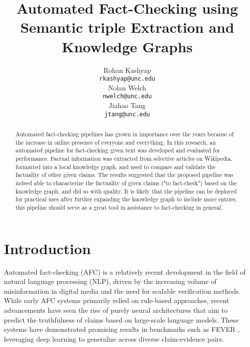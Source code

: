 \documentclass[11pt]{article}
\title{Automated Fact-Checking using Semantic triple Extraction and Knowledge Graphs}
\author{
  Rohan Kashyap \\
  \texttt{rkashyap@unc.edu} \\\And
  Nolan Welch \\
  \texttt{nwelch@unc.edu} \\\And
  Jiahao Tang \\
  \texttt{jtang@unc.edu}
}
\begin{document}
\maketitle
\begin{abstract}
Automated fact-checking pipelines has grown in importance over the years because of the increase in online presence of everyone and everything. In this research, an automated pipeline for fact-checking given text was developed and evaluated for performance. Factual information was extracted from selective articles on Wikipedia, formatted into a local knowledge graph, and used to compare and validate the factuality of other given claims. The results suggested that the proposed pipeline was indeed able to characterize the factuality of given claims ("to fact-check") based on the knowledge graph, and did so with quality. It is likely that the pipeline can be deployed for practical uses after further expanding the knowledge graph to include more entries; this pipeline should serve as a great tool in assistance to fact-checking in general. 
\end{abstract}

\section{Introduction}
Automated fact-checking (AFC) is a relatively recent development in the field of natural language processing (NLP), driven by the increasing volume of misinformation in digital media and the need for scalable verification methods. While early AFC systems primarily relied on rule-based approaches, recent advancements have seen the rise of purely neural architectures that aim to predict the truthfulness of claims based on large-scale language models. These systems have demonstrated promising results in benchmarks such as FEVER \cite{fever}, leveraging deep learning to generalize across diverse claim-evidence pairs.
\end{document}
